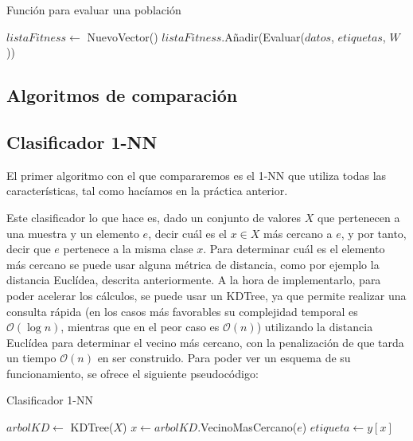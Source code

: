 \documentclass[11pt,a4paper]{article}
\begin{document}
\begin{algorithm}[H]
\caption{Función para evaluar una población}
\begin{algorithmic}[1]
\State $listaFitness \gets $ NuevoVector()
	\State $listaFitness$.Añadir(Evaluar($datos$, $etiquetas$, $W$))
\EndFor
\State {}
\EndFunction
\end{algorithmic}
\end{algorithm}

\subsection{Algoritmos de comparación}

\subsection{Clasificador 1-NN}

El primer algoritmo con el que compararemos es el 1-NN que utiliza todas las características, tal como hacíamos en la 
práctica anterior.

Este clasificador lo que hace es, dado un conjunto de valores $X$ que pertenecen a una muestra y un elemento $e$, decir cuál es el
$x \in X$ más cercano a $e$, y por tanto, decir que $e$ pertenece a la misma clase $x$. Para determinar cuál es el elemento más
cercano se puede usar alguna métrica de distancia, como por ejemplo la distancia Euclídea, descrita anteriormente. A la hora de
implementarlo, para poder acelerar los cálculos, se puede usar un KDTree, ya que permite realizar una consulta rápida (en los
casos más favorables su complejidad temporal es $\mathcal{O} (\log n)$, mientras que en el peor caso es $\mathcal{O}(n)$)
utilizando la distancia Euclídea para determinar el vecino más cercano, con la penalización de que tarda un tiempo
$\mathcal{O}(n)$ en ser construido. Para poder ver un esquema de su funcionamiento, se ofrece el siguiente pseudocódigo:

\begin{algorithm}[H]
\caption{Clasificador 1-NN}
\begin{algorithmic}[1]
\State $arbolKD \gets$ KDTree($X$)
\State $x \gets arbolKD$.VecinoMasCercano($e$)
\State $etiqueta \gets y[x]$
\State {}
\EndFunction
\end{algorithmic}
\end{algorithm}
\end{document}
